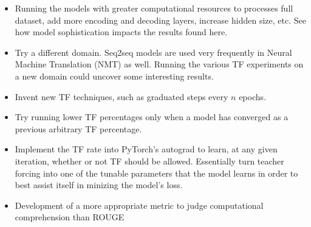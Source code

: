 \begin{itemize}
\item Running the models with greater computational resources to processes full dataset, add more encoding and decoding layers, increase hidden size, etc. See how model sophistication impacts the results found here.
\item Try a different domain. Seq2seq models are used very frequently in Neural Machine Translation (NMT) as well. Running the various TF experiments on a new domain could uncover some interesting results.
\item Invent new TF techniques, such as graduated steps every $n$ epochs.
\item Try running lower TF percentages only when a model has converged as a previous arbitrary TF percentage.
\item Implement the TF rate into PyTorch's autograd to learn, at any given iteration, whether or not TF should be allowed. Essentially turn teacher forcing into one of the tunable parameters that the model learns in order to best assist itself in minizing the model's loss.
\item Development of a more appropriate metric to judge computational comprehension than ROUGE
\end{itemize}